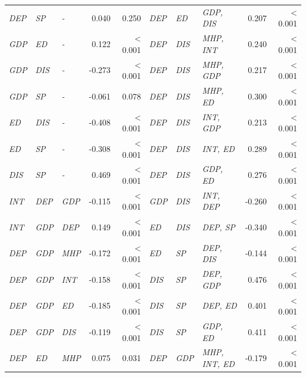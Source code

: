 \begin{tabular}{lllrr|lllrr}
\textit{DEP} & \textit{SP} & \textit{-} & 0.040 & 0.250 & \textit{DEP} & \textit{ED} & \textit{GDP, DIS} & 0.207 & \textless{} 0.001 \\
\textit{GDP} & \textit{ED} & \textit{-} & 0.122 & \textless{} 0.001 & \textit{DEP} & \textit{DIS} & \textit{MHP, INT} & 0.240 & \textless{} 0.001 \\
\textit{GDP} & \textit{DIS} & \textit{-} & -0.273 & \textless{} 0.001 & \textit{DEP} & \textit{DIS} & \textit{MHP, GDP} & 0.217 & \textless{} 0.001 \\
\textit{GDP} & \textit{SP} & \textit{-} & -0.061 & 0.078 & \textit{DEP} & \textit{DIS} & \textit{MHP, ED} & 0.300 & \textless{} 0.001 \\
\textit{ED} & \textit{DIS} & \textit{-} & -0.408 & \textless{} 0.001 & \textit{DEP} & \textit{DIS} & \textit{INT, GDP} & 0.213 & \textless{} 0.001 \\
\textit{ED} & \textit{SP} & \textit{-} & -0.308 & \textless{} 0.001 & \textit{DEP} & \textit{DIS} & \textit{INT, ED} & 0.289 & \textless{} 0.001 \\
\textit{DIS} & \textit{SP} & \textit{-} & 0.469 & \textless{} 0.001 & \textit{DEP} & \textit{DIS} & \textit{GDP, ED} & 0.276 & \textless{} 0.001 \\
\textit{INT} & \textit{DEP} & \textit{GDP} & -0.115 & \textless{} 0.001 & \textit{GDP} & \textit{DIS} & \textit{INT, DEP} & -0.260 & \textless{} 0.001 \\
\textit{INT} & \textit{GDP} & \textit{DEP} & 0.149 & \textless{} 0.001 & \textit{ED} & \textit{DIS} & \textit{DEP, SP} & -0.340 & \textless{} 0.001 \\
\textit{DEP} & \textit{GDP} & \textit{MHP} & -0.172 & \textless{} 0.001 & \textit{ED} & \textit{SP} & \textit{DEP, DIS} & -0.144 & \textless{} 0.001 \\
\textit{DEP} & \textit{GDP} & \textit{INT} & -0.158 & \textless{} 0.001 & \textit{DIS} & \textit{SP} & \textit{DEP, GDP} & 0.476 & \textless{} 0.001 \\
\textit{DEP} & \textit{GDP} & \textit{ED} & -0.185 & \textless{} 0.001 & \textit{DIS} & \textit{SP} & \textit{DEP, ED} & 0.401 & \textless{} 0.001 \\
\textit{DEP} & \textit{GDP} & \textit{DIS} & -0.119 & \textless{} 0.001 & \textit{DIS} & \textit{SP} & \textit{GDP, ED} & 0.411 & \textless{} 0.001 \\
\textit{DEP} & \textit{ED} & \textit{MHP} & 0.075 & 0.031 & \textit{DEP} & \textit{GDP} & \textit{MHP, INT, ED} & -0.179 & \textless{} 0.001 \\

\end{tabular}

